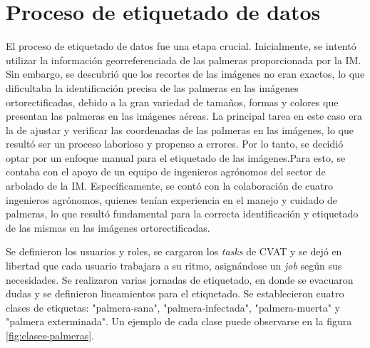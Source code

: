 
\section{Proceso de etiquetado de datos}
\label{sec:etiquetado}


El proceso de etiquetado de datos fue una etapa crucial. Inicialmente, se intentó utilizar la información georreferenciada de las palmeras proporcionada por la IM. Sin embargo, se descubrió que los recortes de las imágenes no eran exactos, lo que dificultaba la identificación precisa de las palmeras en las imágenes ortorectificadas, debido a la gran variedad de tamaños, formas y colores que presentan las palmeras en las imágenes aéreas. La principal tarea en este caso era la de ajustar y verificar las coordenadas de las palmeras en las imágenes, lo que resultó ser un proceso laborioso y propenso a errores. Por lo tanto, se decidió optar por un enfoque manual para el etiquetado de las imágenes.Para esto, se contaba con el apoyo de un equipo de ingenieros agrónomos del sector de arbolado de la IM. Específicamente, se contó con la colaboración de cuatro ingenieros agrónomos, quienes tenían experiencia en el manejo y cuidado de palmeras, lo que resultó fundamental para la correcta identificación y etiquetado de las mismas en las imágenes ortorectificadas.

Se definieron los usuarios y roles, se cargaron los \textit{tasks} de CVAT y se dejó en libertad que cada usuario trabajara a su ritmo, asignándose un \textit{job} según sus necesidades. Se realizaron varias jornadas de etiquetado, en donde se evacuaron dudas y se definieron lineamientos para el etiquetado. Se establecieron cuatro clases de etiquetas: "palmera-sana", "palmera-infectada", "palmera-muerta" y "palmera exterminada". Un ejemplo de cada clase puede observarse en la figura \ref{fig:clases-palmeras}.

